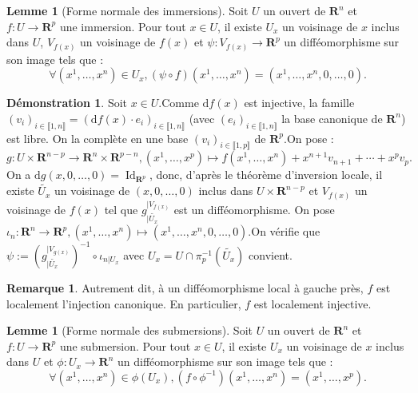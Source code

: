 \documentclass[12pt,a4paper]{article}
\DeclareMathOperator{\Id}{Id}
\theoremstyle{definition}
\newtheorem{rqe}[thm]{Remarque}
\newtheorem*{dem}{Démonstration}
\newtheorem{lem}[thm]{Lemme}
\begin{document}
\begin{lem}[Forme normale des immersions]
Soit $U$ un ouvert de $\mathbf{R}^n$ et $f:U\to \mathbf{R}^p$ une immersion. Pour tout $x\in U$, il existe $U_x$ un voisinage de $x$ inclus dans $U$, $V_{f(x)}$ un voisinage de $f(x)$ et $\psi:V_{f(x)}\to\mathbf{R}^p$ un difféomorphisme sur son image tels que :
$$
\forall (x^1,\ldots,x^n)\in U_x,(\psi\circ f)(x^1,\ldots,x^n)=(x^1,\ldots,x^n,0,\ldots,0).
$$
\end{lem}
\begin{dem}
Soit $x\in U$.\newline Comme $\mathrm{d}f(x)$ est injective, la famille $(v_i)_{i\in\llbracket 1,n\rrbracket}=(\mathrm{d}f(x)\cdot e_i)_{i\in\llbracket 1,n\rrbracket}$ (avec $(e_i)_{i\in\llbracket 1,n\rrbracket}$ la base canonique de $\mathbf{R}^n$) est libre. On la complète en une base $(v_i)_{i\in\llbracket 1,p\rrbracket}$ de $\mathbf{R}^p$.\newline On pose :$$g:U\times\mathbf{R}^{n-p}\to\mathbf{R}^n\times\mathbf{R}^{p-n},(x^1,\ldots,x^p)\mapsto f(x^1,\ldots,x^n)+x^{n+1}v_{n+1}+\cdots+x^{p}v_p.$$
On a $\mathrm{d}g(x,0,\ldots,0)=\Id_{\mathbf{R}^p}$, donc, d'après le théorème d'inversion locale, il existe $\widetilde{U_x}$ un voisinage de $(x,0,\ldots,0)$ inclus dans $U\times\mathbf{R}^{n-p}$ et $V_{f(x)}$ un voisinage de $f(x)$ tel que $g_{|\widetilde{U_x}}^{|V_{f(x)}}$ est un difféomorphisme. On pose $\iota_n:\mathbf{R}^n\to\mathbf{R}^p,(x^1,\ldots,x^n)\mapsto (x^1,\ldots,x^n,0,\ldots,0)$.\newline On vérifie que $\psi:=\left(g_{|\widetilde{U_x}}^{|V_{g(x)}}\right)^{-1}\circ \iota_{n|U_x}$ avec $U_x=U\cap \pi_p^{-1}\left(\widetilde{U_x}\right)$ convient.
\end{dem}
\begin{rqe}
Autrement dit, à un difféomorphisme local à gauche près, $f$ est localement l'injection canonique. En particulier, $f$ est localement injective.
\end{rqe}
\begin{lem}[Forme normale des submersions]
Soit $U$ un ouvert de $\mathbf{R}^n$ et $f:U\to \mathbf{R}^p$ une submersion. Pour tout $x\in U$, il existe $U_x$ un voisinage de $x$ inclus dans $U$ et $\phi:U_x\to\mathbf{R}^n$ un difféomorphisme sur son image tels que :
$$
\forall (x^1,\ldots,x^n)\in \phi(U_x),\left(f\circ\phi^{-1}\right)(x^1,\ldots,x^n)=(x^1,\ldots,x^p).
$$
\end{lem}
\end{document}
